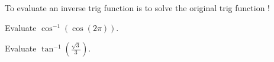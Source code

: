 \documentclass[../main.tex]{subfiles}
\begin{document}
To evaluate an inverse trig function is to solve the original trig function !

\begin{example}
  Evaluate \(\cos^{-1}(\cos(2\pi))\). 

\end{example}

\begin{example}
  Evaluate \(\tan^{-1}\left(\frac{\sqrt{3}}{3}\right)\).

\end{example}
\end{document}
